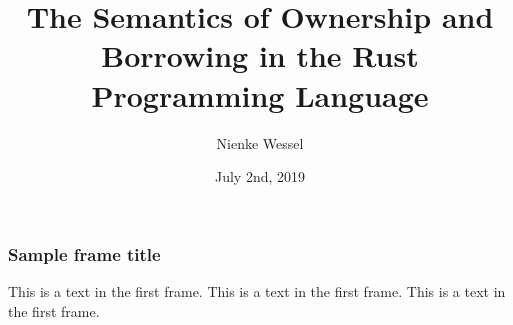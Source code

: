\documentclass{beamer}
\title{The Semantics of Ownership and Borrowing in the Rust Programming Language}
\author{Nienke Wessel}
\institute{Radboud University}
\date{July 2nd, 2019}
\begin{document}
 
\frame{\titlepage}
 
\begin{frame}
\frametitle{Sample frame title}
This is a text in the first frame. This is a text in the first frame. This is a text in the first frame.
\end{frame}
 
\end{document}
